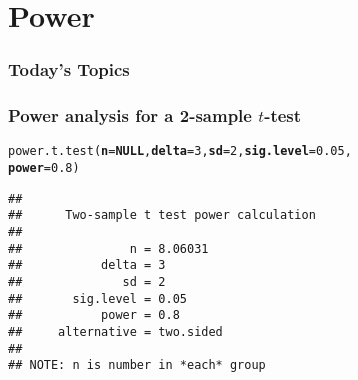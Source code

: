 \documentclass[color=usenames,dvipsnames]{beamer}\usepackage[]{graphicx}\usepackage[]{color}
\makeatletter
\newcommand{\hlnum}[1]{\textcolor[rgb]{0.69,0.494,0}{#1}}%
\newcommand{\hlstd}[1]{\textcolor[rgb]{0,0,0}{#1}}%
\newcommand{\hlkwa}[1]{\textcolor[rgb]{0,0,0}{\textbf{#1}}}%
\newcommand{\hlkwc}[1]{\textcolor[rgb]{0,0,0}{\textbf{#1}}}%
\newcommand{\hlkwd}[1]{\textcolor[rgb]{0.004,0.004,0.506}{#1}}%
\newenvironment{kframe}{%
 \def\at@end@of@kframe{}%
 \ifinner\ifhmode%
  \def\at@end@of@kframe{\end{minipage}}%
  \begin{minipage}{\columnwidth}%
 \fi\fi%
 \def\FrameCommand##1{\hskip\@totalleftmargin \hskip-\fboxsep
 \colorbox{shadecolor}{##1}\hskip-\fboxsep
     \hskip-\linewidth \hskip-\@totalleftmargin \hskip\columnwidth}%
 \MakeFramed {\advance\hsize-\width
   \@totalleftmargin\z@ \linewidth\hsize
   \@setminipage}}%
 {\par\unskip\endMakeFramed%
 \at@end@of@kframe}
\newenvironment{knitrout}{}{} %
\makeatother
\begin{document}
\section{Power}


\begin{frame}[plain]
  \frametitle{Today's Topics}
  \Large
  \tableofcontents[currentsection]
\end{frame}





\begin{frame}[fragile]
\frametitle{Power analysis for a 2-sample $t$-test}
\begin{knitrout}\footnotesize
{}\color{fgcolor}\begin{kframe}
\begin{alltt}
\hlkwd{power.t.test}\hlstd{(}\hlkwc{n}\hlstd{=}\hlkwa{NULL}\hlstd{,} \hlkwc{delta}\hlstd{=}\hlnum{3}\hlstd{,} \hlkwc{sd}\hlstd{=}\hlnum{2}\hlstd{,} \hlkwc{sig.level}\hlstd{=}\hlnum{0.05}\hlstd{,}
             \hlkwc{power}\hlstd{=}\hlnum{0.8}\hlstd{)}
\end{alltt}
\begin{verbatim}
## 
##      Two-sample t test power calculation 
## 
##               n = 8.06031
##           delta = 3
##              sd = 2
##       sig.level = 0.05
##           power = 0.8
##     alternative = two.sided
## 
## NOTE: n is number in *each* group
\end{verbatim}
\end{kframe}
\end{knitrout}
\end{frame}
\end{document}
